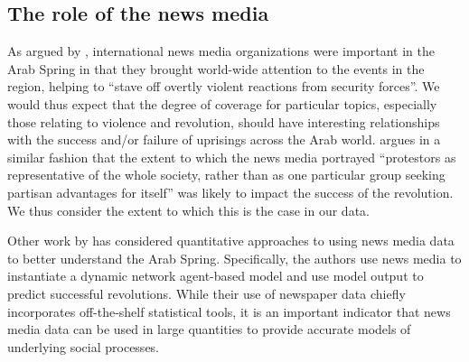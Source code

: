 

	
\subsection{The role of the news media}

As argued by \cite{hussain_what_2013}, international news media organizations were important in the Arab Spring in that they brought world-wide attention to the events in the region, helping to ``stave off overtly violent reactions from security forces''.  We would thus expect that the degree of coverage for particular topics, especially those relating to violence and revolution, should have interesting relationships with the success and/or failure of uprisings across the Arab world.  \cite{goldstone_cross-class_2011} argues in a similar fashion that the extent to which the news media portrayed ``protestors as representative of the whole society, rather than as one particular group seeking partisan advantages for itself'' was likely to impact the success of the revolution.  We thus consider the extent to which this is the case in our data.

Other work by \cite{joseph_arab_2014} has considered quantitative approaches to using news media data to better understand the Arab Spring.  Specifically, the authors use news media to instantiate a dynamic network agent-based model and use model output to predict successful revolutions.  While their use of newspaper data chiefly incorporates off-the-shelf statistical tools, it is an important indicator that news media data can be used 	in large quantities to provide accurate models of underlying social processes.
%
%
%
%


